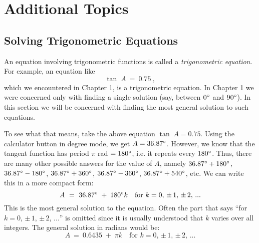 \chapter{Additional Topics}
\section{Solving Trigonometric Equations}
An equation involving trigonometric functions is called a \emph{trigonometric
equation}. For example, an equation like
\begin{displaymath}
 \tan\;A ~=~ 0.75 ~,
\end{displaymath}
which we encountered in Chapter 1, is a trigonometric equation. In Chapter 1 we were concerned only
with finding a single solution (say, between $0^\circ$ and $90^\circ$). In this section we will
be concerned with finding the most general solution to such equations.

To see what that means, take the above equation $\tan\;A = 0.75$. Using the
{\setlength\fboxsep{1pt}} calculator button in degree mode, we
get $A=36.87^\circ$. However, we know that the tangent function has period $\pi$ rad
$= 180^\circ$, i.e. it repeats every $180^\circ$. Thus, there are many other possible answers
for the value of $A$, namely $36.87^\circ + 180^\circ$, $36.87^\circ - 180^\circ$,
$36.87^\circ + 360^\circ$, $36.87^\circ - 360^\circ$, $36.87^\circ + 540^\circ$, etc.
We can write this in a more compact form:
\begin{displaymath}
 A ~=~ 36.87^\circ \;+\; 180^\circ k \quad\text{for $k=0$, $\pm\,1$, $\pm\,2$, $...$}
\end{displaymath}
This is the most general solution to the equation.
Often the part that says ``for $k=0$, $\pm\,1$, $\pm\,2$, $...$'' is omitted since it is
usually understood that $k$ varies over all integers. The general solution in radians would be:
\begin{displaymath}
 A ~=~ 0.6435 \;+\; \pi k \quad\text{for $k=0$, $\pm\,1$, $\pm\,2$, $...$}
\end{displaymath}

